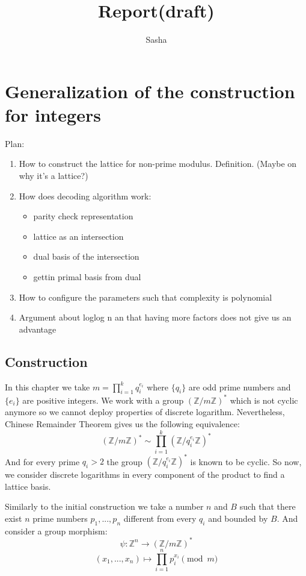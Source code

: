 \documentclass[12pt]{article}
\title{Report(draft)}
\author{ Sasha }
\newcommand{\zz}{\mathbb{Z}}
\begin{document}
\maketitle

\section{Generalization of the construction for integers}
Plan:
\begin{enumerate}
    \item How to construct the lattice for non-prime modulus. Definition. (Maybe on why it's a lattice?)
    \item How does decoding algorithm work:
    \begin{itemize}
        \item parity check representation
        \item lattice as an intersection
        \item dual basis of the intersection
        \item gettin primal basis from dual
    \end{itemize}
    \item How to configure the parameters such that complexity is polynomial
    \item Argument about loglog n an that having more factors does not give us an advantage
\end{enumerate}

\subsection{Construction}
In this chapter we take $m = \prod_{i=1}^{k} q_{i}^{e_{i}}$ where $\{q_{i}\}$ are odd prime numbers and $\{e_{i}\}$ are positive integers. We work with a group $(\zz/m\zz)^*$ which is not cyclic anymore so we cannot deploy properties of discrete logarithm. Nevertheless, Chinese Remainder Theorem gives us the following equivalence:
\begin{equation}
    (\zz/m\zz)^* \sim \prod_{i=1}^{k}(\zz/q_{i}^{e_{i}}\zz)^*
\end{equation}
And for every prime $q_{i} > 2$ the group $(\zz/q_{i}^{e_{i}}\zz)^*$ is known to be cyclic. So now, we consider discrete logarithms in every component of the product to find a lattice basis.

Similarly to the initial construction we take a number $n$ and $B$ such that there exist $n$ prime numbers $p_{1}, ... , p_{n}$ different from every $q_{i}$ and bounded by $B$. And consider a group morphism:
\begin{equation}
    \psi : \zz^{n} \rightarrow (\zz/m\zz)^*
\end{equation}
\begin{equation}
    (x_{1}, ..., x_{n}) \mapsto \prod_{i=1}^{n}p_{i}^{x_{i}} \pmod{m}
\end{equation}
\end{document}
